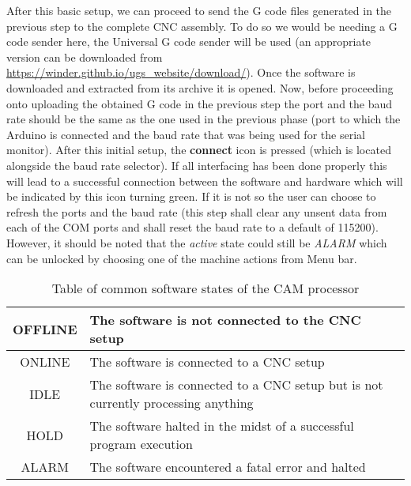 After this basic setup, we can proceed to send the G code files generated in the previous step to the complete CNC assembly. To do so we would be needing a G code sender here, the Universal G code sender will be used (an appropriate version can be downloaded from \url{https://winder.github.io/ugs_website/download/}). Once the software is downloaded and extracted from its archive it is opened. Now, before proceeding onto uploading the obtained G code in the previous step the port and the baud rate should be the same as the one used in the previous phase (port to which the Arduino is connected and the baud rate that was being used for the serial monitor). After this initial setup, the \textbf{connect} icon is pressed (which is located alongside the baud rate selector). If all interfacing has been done properly this will lead to a successful connection between the software and hardware which will be indicated by this icon turning green. If it is not so the user can choose to refresh the ports and the baud rate (this step shall clear any unsent data from each of the COM ports and shall reset the baud rate to a default of 115200). However, it should be noted that the \textit{active} state could still be \textit{ALARM} which can be unlocked by choosing one of the machine actions from Menu bar.

\begin{table}[h]
 \def\arraystretch{1.5}
 \begin{center}
  \caption{Table of common software states of the CAM processor}
  \begin{tabular}{|c|l|}
   \hline
   OFFLINE & The software is not connected to the CNC setup                                    \\
   \hline
   ONLINE  & The software is connected to a CNC setup                                          \\
   \hline
   IDLE    & The software is connected to a CNC setup but is not currently processing anything \\
   \hline
   HOLD    & The software halted in the midst of a successful program execution                \\
   \hline
   ALARM   & The software encountered a fatal error and halted                                 \\
   \hline
  \end{tabular}
 \end{center}
 \label{tab:soft_states}
\end{table}


